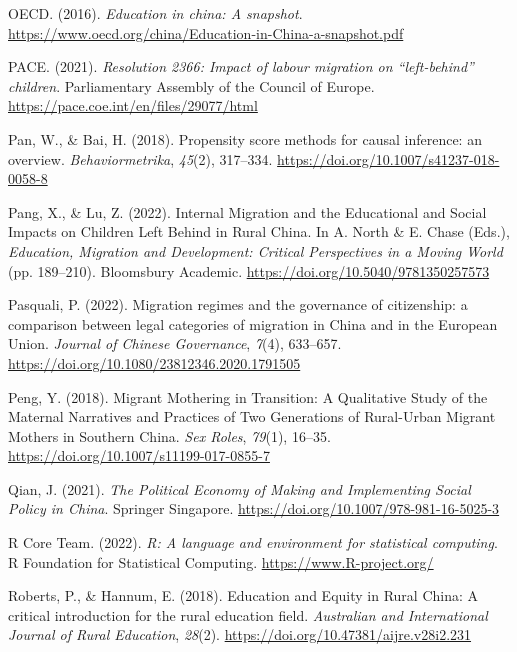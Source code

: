 \documentclass[
  man,floatsintext]{apa7}
\newlength{\cslhangindent}
\newlength{\cslentryspacingunit} %
\newenvironment{CSLReferences}[2] %
 {%
  \setlength{\parindent}{0pt}
  \ifodd #1
  \let\oldpar\par
  \def\par{\hangindent=\cslhangindent\oldpar}
  \fi
  \setlength{\parskip}{#2\cslentryspacingunit}
 }%
 {}
\begin{document}
\begin{CSLReferences}{1}{0}
\leavevmode{}%
OECD. (2016). \emph{Education in china: A snapshot}. \url{https://www.oecd.org/china/Education-in-China-a-snapshot.pdf}

\leavevmode{}%
PACE. (2021). \emph{Resolution 2366: Impact of labour migration on {``}left-behind{''} children}. Parliamentary Assembly of the Council of Europe. \url{https://pace.coe.int/en/files/29077/html}

\leavevmode{}%
Pan, W., \& Bai, H. (2018). Propensity score methods for causal inference: an overview. \emph{Behaviormetrika}, \emph{45}(2), 317--334. \url{https://doi.org/10.1007/s41237-018-0058-8}

\leavevmode{}%
Pang, X., \& Lu, Z. (2022). Internal Migration and the Educational and Social Impacts on Children Left Behind in Rural China. In A. North \& E. Chase (Eds.), \emph{Education, Migration and Development: Critical Perspectives in a Moving World} (pp. 189--210). Bloomsbury Academic. \url{https://doi.org/10.5040/9781350257573}

\leavevmode{}%
Pasquali, P. (2022). Migration regimes and the governance of citizenship: a comparison between legal categories of migration in China and in the European Union. \emph{Journal of Chinese Governance}, \emph{7}(4), 633--657. \url{https://doi.org/10.1080/23812346.2020.1791505}

\leavevmode{}%
Peng, Y. (2018). Migrant Mothering in Transition: A Qualitative Study of the Maternal Narratives and Practices of Two Generations of Rural-Urban Migrant Mothers in Southern China. \emph{Sex Roles}, \emph{79}(1), 16--35. \url{https://doi.org/10.1007/s11199-017-0855-7}

\leavevmode{}%
Qian, J. (2021). \emph{The Political Economy of Making and Implementing Social Policy in China}. Springer Singapore. \url{https://doi.org/10.1007/978-981-16-5025-3}

\leavevmode{}%
R Core Team. (2022). \emph{R: A language and environment for statistical computing}. R Foundation for Statistical Computing. \url{https://www.R-project.org/}

\leavevmode{}%
Roberts, P., \& Hannum, E. (2018). Education and Equity in Rural China: A critical introduction for the rural education field. \emph{Australian and International Journal of Rural Education}, \emph{28}(2). \url{https://doi.org/10.47381/aijre.v28i2.231}


\end{CSLReferences}
\end{document}
